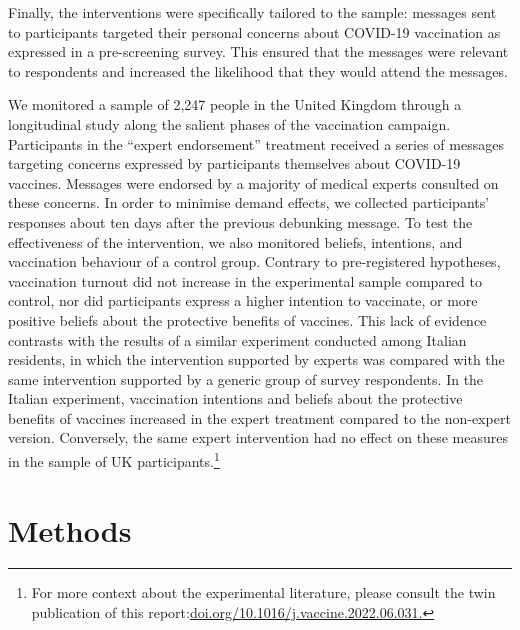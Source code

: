 \documentclass[authordate, empirical]{jote-new-article}
\begin{document}
	Finally, the interventions were specifically tailored to the sample: messages sent to participants targeted their personal concerns about COVID-19 vaccination as expressed in a pre-screening survey. This ensured that the messages were relevant to respondents and increased the likelihood that they would attend the messages.



	We monitored a sample of 2,247 people in the United Kingdom through a longitudinal study along the salient phases of the vaccination campaign. Participants in the “expert endorsement” treatment received a series of messages targeting concerns expressed by participants themselves about COVID-19 vaccines. Messages were endorsed by a majority of medical experts consulted on these concerns. In order to minimise demand effects, we collected participants' responses about ten days after the previous debunking message. To test the effectiveness of the intervention, we also monitored beliefs, intentions, and vaccination behaviour of a control group. Contrary to pre-registered hypotheses, vaccination turnout did not increase in the experimental sample compared to control, nor did participants express a higher intention to vaccinate, or more positive beliefs about the protective benefits of vaccines. This lack of evidence contrasts with the results of a similar experiment conducted among Italian residents, \parencites{Ronzani2022} in which the intervention supported by experts was compared with the same intervention supported by a generic group of survey respondents. In the Italian experiment, vaccination intentions and beliefs about the protective benefits of vaccines increased in the expert treatment compared to the non-expert version. Conversely, the same expert intervention had no effect on these measures in the sample of UK participants.\footnote{ For more context about the experimental literature, please consult the twin publication of this report:\href{https://doi.org/10.1016/j.vaccine.2022.06.031}{doi.org/10.1016/j.vaccine.2022.06.031.}}



	\section{Methods}
\end{document}
